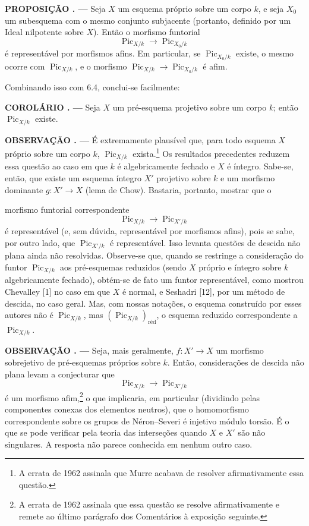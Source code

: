 \documentclass[11pt,twoside,openany]{book}
\numberwithin{equation}{section}
\newcommand{\src}[1]{%
  \phantomsection\hypertarget{src:#1}{}%
  \marginpar{\raggedleft\footnotesize\sffamily #1}%
}
\theoremstyle{plain}
\theoremstyle{definition}
\theoremstyle{remark}
\newcommand{\result}[2]{%
  \par\medskip\noindent\textbf{#1%
  \if\relax\detokenize{#2}\relax\else\space#2\fi. ---}\enspace
}
\newcommand{\FgaUnitKey}{frontmatter}
\renewcommand{\src}[1]{%
  \phantomsection\hypertarget{src:\FgaUnitKey:#1}{}%
  \marginpar{\raggedleft\footnotesize\sffamily #1}%
}
\begin{document}
\result{PROPOSIÇÃO}{6.5} Seja $X$ um esquema próprio sobre um corpo $k$, e seja
$X_0$ um subesquema com o mesmo conjunto subjacente (portanto, definido por um
Ideal nilpotente sobre $X$). Então o morfismo funtorial
\[
\operatorname{Pic}_{X/k}\longrightarrow\operatorname{Pic}_{X_0/k}
\]
é representável por morfismos afins. Em particular, se
$\operatorname{Pic}_{X_0/k}$ existe, o mesmo ocorre com
$\operatorname{Pic}_{X/k}$, e o morfismo
$\operatorname{Pic}_{X/k}\longrightarrow\operatorname{Pic}_{X_0/k}$ é afim.

Combinando isso com 6.4, conclui-se facilmente:

\result{COROLÁRIO}{6.6} Seja $X$ um pré-esquema projetivo sobre um corpo $k$;
então $\operatorname{Pic}_{X/k}$ existe.

\result{OBSERVAÇÃO}{6.6} É extremamente plausível que, para todo esquema $X$
próprio sobre um corpo $k$, $\operatorname{Pic}_{X/k}$ exista.\footnote{A
errata de 1962 assinala que Murre acabava de resolver afirmativamente essa
questão.} Os resultados precedentes reduzem essa questão ao caso em que $k$ é
algebricamente fechado e $X$ é íntegro. Sabe-se, então, que existe um esquema
íntegro $X'$ projetivo sobre $k$ e um morfismo dominante
$g:X'\longrightarrow X$ (lema de Chow). Bastaria, portanto, mostrar que o
\src{160}
morfismo funtorial correspondente
\[
\operatorname{Pic}_{X/k}\longrightarrow\operatorname{Pic}_{X'/k}
\]
é representável (e, sem dúvida, representável por morfismos afins), pois se
sabe, por outro lado, que $\operatorname{Pic}_{X'/k}$ é representável. Isso
levanta questões de descida não plana ainda não resolvidas. Observe-se que,
quando se restringe a consideração do funtor $\operatorname{Pic}_{X/k}$ aos
pré-esquemas reduzidos (sendo $X$ próprio e íntegro sobre $k$ algebricamente
fechado), obtém-se de fato um funtor representável, como mostrou Chevalley [1]
no caso em que $X$ é normal, e Seshadri [12], por um método de descida, no caso
geral. Mas, com nossas notações, o esquema construído por esses autores não é
$\operatorname{Pic}_{X/k}$, mas
$(\operatorname{Pic}_{X/k})_{\mathrm{réd}}$, o esquema reduzido correspondente
a $\operatorname{Pic}_{X/k}$.

\result{OBSERVAÇÃO}{6.7} Seja, mais geralmente, $f:X'\longrightarrow X$ um
morfismo sobrejetivo de pré-esquemas próprios sobre $k$. Então, considerações de
descida não plana levam a conjecturar que
\[
\operatorname{Pic}_{X/k}\longrightarrow\operatorname{Pic}_{X'/k}
\]
é um morfismo afim,\footnote{A errata de 1962 assinala que essa questão se
resolve afirmativamente e remete ao último parágrafo dos Comentários à
exposição seguinte.} o que implicaria, em particular (dividindo pelas
componentes conexas dos elementos neutros), que o homomorfismo correspondente
sobre os grupos de Néron--Severi é injetivo módulo torsão. É o que se pode
verificar pela teoria das interseções quando $X$ e $X'$ são não singulares. A
resposta não parece conhecida em nenhum outro caso.
\end{document}

